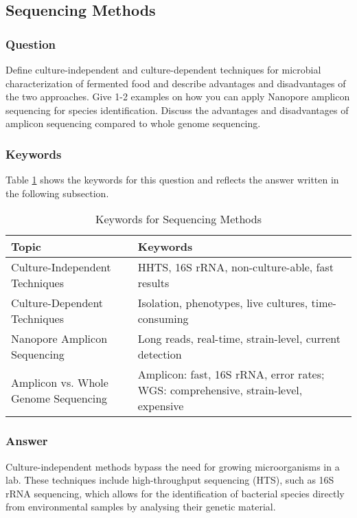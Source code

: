 \subsection{Sequencing Methods}
\subsubsection*{Question}
Define culture-independent and culture-dependent techniques for microbial characterization of fermented food and describe advantages and disadvantages of the two approaches. Give 1-2 examples on how you can apply Nanopore amplicon sequencing for species identification. Discuss the advantages and disadvantages of amplicon sequencing compared to whole genome sequencing. 

\subsubsection*{Keywords}
Table \ref{tab:KW-Sequencing} shows the keywords for this question and reflects the answer written in the following subsection.
\begin{table}[h]
    \centering
    \caption{Keywords for Sequencing Methods} 
    \label{tab:KW-Sequencing}
    \begin{tabular}{l|l}
        \textbf{Topic} & \textbf{Keywords} \\
        \hline
        Culture-Independent Techniques & HHTS, 16S rRNA, non-culture-able, fast results \\

        Culture-Dependent Techniques & Isolation, phenotypes, live cultures, time-consuming \\

        Nanopore Amplicon Sequencing & Long reads, real-time, strain-level, current detection \\

        Amplicon vs. Whole Genome Sequencing & Amplicon: fast, 16S rRNA, error rates; WGS: comprehensive, strain-level, expensive \\
    \end{tabular}
\end{table}

\subsubsection*{Answer}
Culture-independent methods bypass the need for growing microorganisms in a lab. These techniques include high-throughput sequencing (HTS), such as 16S rRNA sequencing, which allows for the identification of bacterial species directly from environmental samples by analysing their genetic material.


